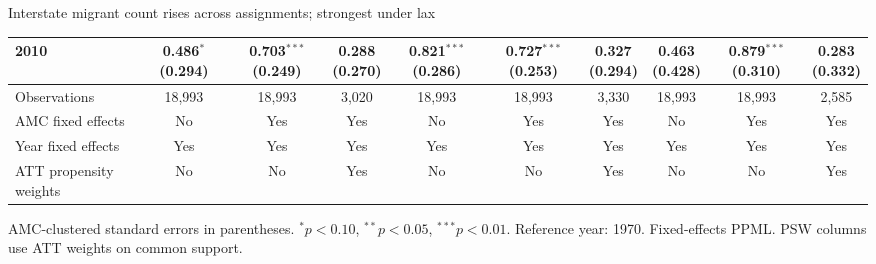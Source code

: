 \documentclass[aspectratio=169]{beamer}
\begin{document}
\begin{frame}{Interstate migrant count rises across assignments; strongest under lax}
{\begin{tabular}{@{}l*{9}{c}@{}}
2010 & \shortstack{0.486$^{*}$\\(0.294)} & \shortstack{0.703$^{***}$\\(0.249)} & \shortstack{0.288\\(0.270)} & \shortstack{0.821$^{***}$\\(0.286)} & \shortstack{0.727$^{***}$\\(0.253)} & \shortstack{0.327\\(0.294)} & \shortstack{0.463\\(0.428)} & \shortstack{0.879$^{***}$\\(0.310)} & \shortstack{0.283\\(0.332)} \\
\midrule
Observations & 18,993 & 18,993 & 3,020 & 18,993 & 18,993 & 3,330 & 18,993 & 18,993 & 2,585 \\
AMC fixed effects & No & Yes & Yes & No & Yes & Yes & No & Yes & Yes \\
Year fixed effects & Yes & Yes & Yes & Yes & Yes & Yes & Yes & Yes & Yes \\
ATT propensity weights & No & No & Yes & No & No & Yes & No & No & Yes \\
\bottomrule
\end{tabular}%
}
\vspace{0.1em}
{\tiny\color{ZMidGray} AMC-clustered standard errors in parentheses. $^{*}p<0.10$, $^{**}p<0.05$, $^{***}p<0.01$. Reference year: 1970. Fixed-effects PPML. PSW columns use ATT weights on common support.}
\end{frame}
\end{document}
